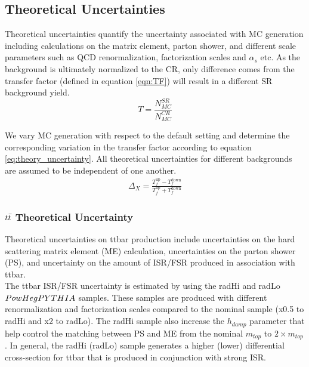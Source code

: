 
\subsection{Theoretical Uncertainties}
\label{sec:TheoSystematics}

\indent Theoretical uncertainties quantify the uncertainty associated with MC generation including calculations on the matrix element, parton shower, and different scale parameters such as QCD renormalization, factorization scales and $\alpha_s$ etc.  As the background is ultimately normalized to the CR, only difference comes from the transfer factor (defined in equation \ref{eqn:TF}) will result in a different SR background yield.  \\

\begin{equation}
T = \frac{N_{MC}^{SR}}{N_{MC}^{CR}}
\label{eqn:TF}
\end{equation}

\indent We vary MC generation with respect to the default setting and determine the corresponding variation in the transfer factor according to equation \ref{eq:theory_uncertainty}.  All theoretical uncertainties for different backgrounds are assumed to be independent of one another. \\

 \begin{eqnarray}
    \Delta_{X} = \frac{T_f^{\mathrm{up}} - T_f^{\mathrm{down}}}{T_f^{\mathrm{up}} + T_f^{\mathrm{down}}}
    \label{eq:theory_uncertainty}
  \end{eqnarray}

\subsubsection*{$t\bar{t}$ Theoretical Uncertainty}

\indent Theoretical uncertainties on ttbar production include uncertainties on the hard scattering matrix element (ME) calculation, uncertainties on the parton shower (PS), and uncertainty on the amount of ISR/FSR produced in association with ttbar.  \\


\indent  The ttbar ISR/FSR uncertainty is estimated by using the radHi and radLo $PowHegPYTHIA$ samples.  These samples are produced with different renormalization and factorization scales compared to the nominal sample (x0.5 to radHi and x2 to radLo).   The radHi sample also increase the $h_{damp}$ parameter that help control the matching between PS and ME from the nominal $m_{top}$ to $2 \times m_{top}$. In general, the radHi (radLo) sample generates a higher (lower) differential cross-section for ttbar that is produced in conjunction with strong ISR.  \\

